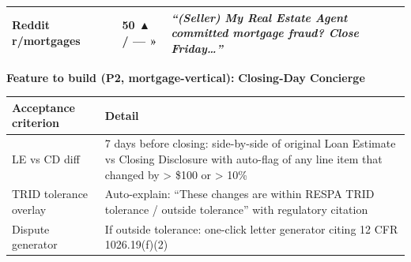 \documentclass[
  10pt,
]{article}
\let\origtexttt\texttt
\renewcommand{\texttt}[1]{\origtexttt{\seqsplit{#1}}}
\begin{document}
\begin{longtable}[]{@{}llll@{}}
\begin{minipage}[t]{0.20\columnwidth}
Reddit r/mortgages\strut
\end{minipage} & \begin{minipage}[t]{0.14\columnwidth}\raggedright
\texttt{1qvfeb9}\strut
\end{minipage} & \begin{minipage}[t]{0.10\columnwidth}\raggedright
50 ▲ / --- »\strut
\end{minipage} & \begin{minipage}[t]{0.44\columnwidth}\raggedright
\emph{``(Seller) My Real Estate Agent committed mortgage fraud? Close Friday\ldots{}''}\strut
\end{minipage}\tabularnewline
\bottomrule
\end{longtable}

\textbf{Feature to build (P2, mortgage-vertical):} \textbf{Closing-Day Concierge}

\begin{longtable}[]{@{}ll@{}}
\toprule
\begin{minipage}[b]{0.47\columnwidth}\raggedright
Acceptance criterion\strut
\end{minipage} & \begin{minipage}[b]{0.47\columnwidth}\raggedright
Detail\strut
\end{minipage}\tabularnewline
\midrule
\endhead
\begin{minipage}[t]{0.47\columnwidth}\raggedright
LE vs CD diff\strut
\end{minipage} & \begin{minipage}[t]{0.47\columnwidth}\raggedright
7 days before closing: side-by-side of original Loan Estimate vs Closing Disclosure with auto-flag
of any line item that changed by \textgreater{} \$100 or \textgreater{} 10\%\strut
\end{minipage}\tabularnewline
\begin{minipage}[t]{0.47\columnwidth}\raggedright
TRID tolerance overlay\strut
\end{minipage} & \begin{minipage}[t]{0.47\columnwidth}\raggedright
Auto-explain: ``These changes are within RESPA TRID tolerance / outside tolerance'' with regulatory
citation\strut
\end{minipage}\tabularnewline
\begin{minipage}[t]{0.47\columnwidth}\raggedright
Dispute generator\strut
\end{minipage} & \begin{minipage}[t]{0.47\columnwidth}\raggedright
If outside tolerance: one-click letter generator citing 12 CFR 1026.19(f)(2)\strut
\end{minipage}\tabularnewline
\bottomrule
\end{longtable}
\end{document}
